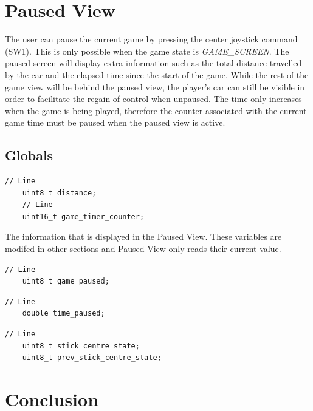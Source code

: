 \documentclass{article}
\begin{document}
\clearpage

\section{Paused View}
The user can pause the current game by pressing the center joystick command (SW1). This is only possible when the game state is \emph{GAME\_SCREEN}. The paused screen will display extra information such as the total distance travelled by the car and the elapsed time since the start of the game. While the rest of the game view will be behind the paused view, the player's car can still be visible in order to facilitate the regain of control when unpaused. The time only increases when the game is being played, therefore the counter associated with the current game time must be paused when the paused view is active.

\subsection*{Globals}
\begin{lstlisting}[style=CStyle]
	// Line
	uint8_t distance;
	// Line
	uint16_t game_timer_counter;
\end{lstlisting}
The information that is displayed in the Paused View. These variables are modifed in other sections and Paused View only reads their current value.
\begin{lstlisting}[style=CStyle]
	// Line
	uint8_t game_paused;
\end{lstlisting}

\begin{lstlisting}[style=CStyle]
	// Line
	double time_paused;
\end{lstlisting}

\begin{lstlisting}[style=CStyle]
	// Line
	uint8_t stick_centre_state;
	uint8_t prev_stick_centre_state;
\end{lstlisting}

\clearpage

\section{Conclusion}
\end{document}
